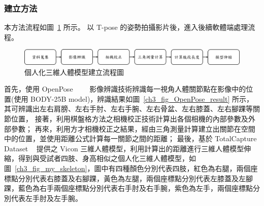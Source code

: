 
\subsubsection{建立方法}
本方法流程如圖~\ref{ch3_fig_skeleton_flow} 所示。
以 T-pose 的姿勢拍攝影片後，進入後續軟體端處理流程。

\begin{figure}[!ht]
   \centering
   \includegraphics[width=\linewidth]{figure/ch3_fig_skeleton_flow.png}
    \caption[個人化三維人體模型建立流程圖]{個人化三維人體模型建立流程圖}
    \label{ch3_fig_skeleton_flow}
\end{figure}

首先，使用 OpenPose~\cite{8765346}~\cite{wei2016cpm}~\cite{simon2017hand}~\cite{cao2017realtime}
影像辨識技術辨識每一視角人體關節點在影像中的位置(使用 BODY-25B model)，辨識結果如圖~\ref{ch3_fig_OpenPose_result} 所示，其可辨識出左右肩膀、左右手肘、左右手腕、左右骨盆、左右膝蓋、左右腳踝等關節位置，
接著，利用棋盤格方法之相機校正技術計算出各個相機的內部參數及外部參數；
再來，利用方才相機校正之結果，經由三角測量計算建立出關節在空間中的位置，並使用距離公式計算每一關節之間的距離；
最後，基於 TotalCapture Dataset ~\cite{Trumble:BMVC:2017} 提供之 Vicon 三維人體模型，利用計算出的距離進行三維人體模型伸縮，得到與受試者四肢、身高相似之個人化三維人體模型，如圖~\ref{ch3_fig_my_skeleton}，圖中有四種顏色分別代表四肢，紅色為右腿，兩個座標點分別代表右膝蓋及右腳踝，黃色為左腿，兩個座標點分別代表左膝蓋及左腳踝，藍色為右手兩個座標點分別代表右手肘及右手腕，紫色為左手，兩個座標點分別代表左手肘及左手腕。

